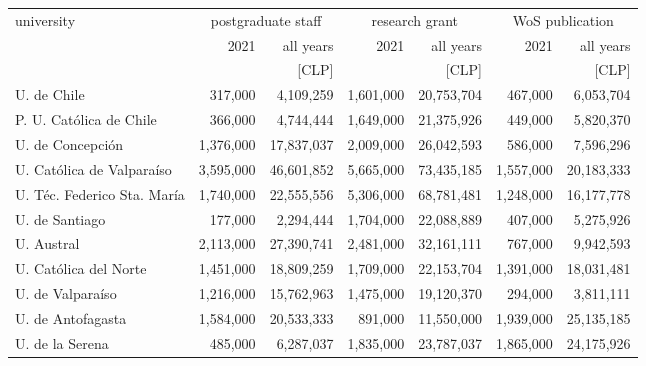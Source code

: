 \begin{tabular}{l rr rr rr}
\hline\hline
university                     & 
                          \multicolumn{2}{c}{postgraduate staff} & 
                                                                \multicolumn{2}{c}{research grant} & 
                                                                                                 \multicolumn{2}{c}{WoS publication} \\
                               &          2021 & all years       &          2021 & all years       &          2021 & all years       \\
                               &               & [CLP]           &               & [CLP]           &               & [CLP]           \\
\hline
U. de Chile                    &       317,000 &       4,109,259 &     1,601,000 &      20,753,704 &       467,000 &       6,053,704 \\
P. U. Católica de Chile        &       366,000 &       4,744,444 &     1,649,000 &      21,375,926 &       449,000 &       5,820,370 \\
U. de Concepción               &     1,376,000 &      17,837,037 &     2,009,000 &      26,042,593 &       586,000 &       7,596,296 \\
U. Católica de Valparaíso      &     3,595,000 &      46,601,852 &     5,665,000 &      73,435,185 &     1,557,000 &      20,183,333 \\
U. Téc. Federico Sta. María    &     1,740,000 &      22,555,556 &     5,306,000 &      68,781,481 &     1,248,000 &      16,177,778 \\
U. de Santiago                 &       177,000 &       2,294,444 &     1,704,000 &      22,088,889 &       407,000 &       5,275,926 \\
U. Austral                     &     2,113,000 &      27,390,741 &     2,481,000 &      32,161,111 &       767,000 &       9,942,593 \\
U. Católica del Norte          &     1,451,000 &      18,809,259 &     1,709,000 &      22,153,704 &     1,391,000 &      18,031,481 \\
U. de Valparaíso               &     1,216,000 &      15,762,963 &     1,475,000 &      19,120,370 &       294,000 &       3,811,111 \\
U. de Antofagasta              &     1,584,000 &      20,533,333 &       891,000 &      11,550,000 &     1,939,000 &      25,135,185 \\
U. de la Serena                &       485,000 &       6,287,037 &     1,835,000 &      23,787,037 &     1,865,000 &      24,175,926 \\

\end{tabular}
